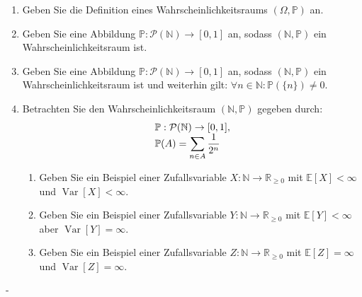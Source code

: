 \documentclass{article}
\begin{document}
\begin{problem}
\begin{enumerate}
\item {
Geben Sie die Definition eines Wahrscheinlichkeitsraums $(\Omega, \mathbb{P})$ an.
}
\item {
Geben Sie eine Abbildung $\mathbb{P}: \mathcal{P}(\mathbb{N}) \to [0, 1]$ an, sodass $(\mathbb{N}, \mathbb{P})$ ein Wahrscheinlichkeitsraum ist.
}
\item {
Geben Sie eine Abbildung $\mathbb{P}: \mathcal{P}(\mathbb{N}) \to [0, 1]$ an, sodass $(\mathbb{N}, \mathbb{P})$ ein Wahrscheinlichkeitsraum ist und weiterhin gilt: $\forall n \in \mathbb{N}: \mathbb{P}(\{n\}) \neq 0$.
}
\item {
Betrachten Sie den Wahrscheinlichkeitsraum $(\mathbb{N}, \mathbb{P})$ gegeben durch:
\[
\begin{array}{>{\displaystyle}l}
\mathbb{P}: \mathcal{P}(\mathbb{N}) \to [0, 1], \\
\mathbb{P}(A) = \sum_{n \in A} \frac{1}{2^n} \\
\end{array}
\]
\begin{enumerate}
\item {
Geben Sie ein Beispiel einer Zufallsvariable $X: \mathbb{N} \to \mathbb{R}_{\geq 0}$ mit $\mathbb{E}[X] < \infty$ und $\operatorname{Var}[X] < \infty$.
}
\item {
Geben Sie ein Beispiel einer Zufallsvariable $Y: \mathbb{N} \to \mathbb{R}_{\geq 0}$ mit $\mathbb{E}[Y] < \infty$ aber $\operatorname{Var}[Y] = \infty$.
}
\item {
Geben Sie ein Beispiel einer Zufallsvariable $Z: \mathbb{N} \to \mathbb{R}_{\geq 0}$ mit $\mathbb{E}[Z] = \infty$ und $\operatorname{Var}[Z] = \infty$.
}
\end{enumerate}
}
\end{enumerate}
\end{problem}

\begin{solution}
-
\end{solution}
\end{document}

